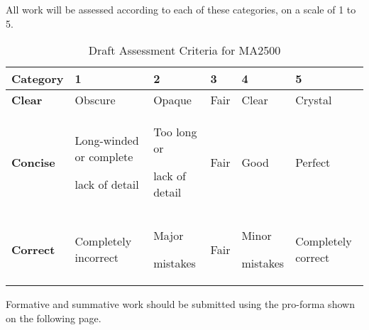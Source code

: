 \vspace*{2ex}
All work will be assessed according to each of these categories, on a scale of 1 to 5.
\vspace*{2ex}

\begin{table}[h]
\centering
\begin{tabular}{| p{2cm} || p{2.0cm} | p{2.0cm} | p{2.0cm} | p{2.0cm} | p{2.0cm} |}\hline
Category		& 1 & 2 & 3 & 4 & 5\\ \hline\hline
\textbf{Clear} & Obscure & Opaque & Fair & Clear & Crystal \\ \hline
\textbf{Concise} & Long-winded or complete\par lack of detail & Too long or\par lack of detail & Fair & Good & Perfect \\ \hline
\textbf{Correct} & Completely incorrect & Major\par mistakes & Fair & Minor\par mistakes & Completely correct \\ \hline
\end{tabular}
\caption*{Draft Assessment Criteria for MA2500}
\end{table}

Formative and summative work should be submitted using the pro-forma shown on the following page.


\endinput
